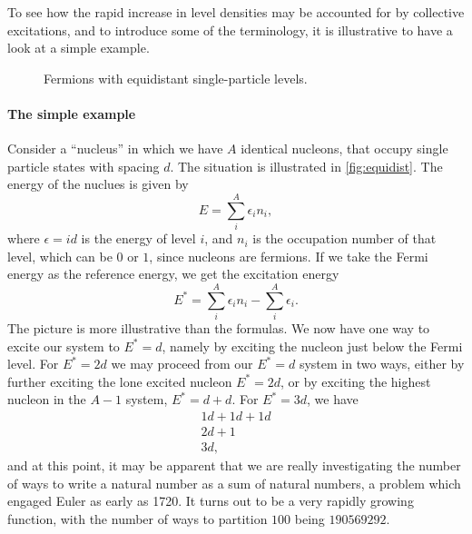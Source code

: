 To see how the rapid increase in level densities may be accounted for by collective excitations, and to introduce some of the terminology, it is illustrative to have a look at a simple example.

\begin{figure}

\caption{\label{fig:equidist} Fermions with equidistant single-particle levels.}
\end{figure}

\paragraph{The simple example}
Consider a ``nucleus'' in which we have $A$ identical nucleons, that occupy single particle states with spacing $d$. The situation is illustrated in \autoref{fig:equidist}. The energy of the nuclues is given by 
\begin{equation}
E=\sum_i^A \epsilon_i n_i,
\end{equation}
where $\epsilon = id$ is the energy of level $i$, and $n_i$ is the occupation number of that level, which can be $0$ or $1$, since nucleons are fermions.
If we take the Fermi energy as the reference energy, we get the excitation energy
\begin{equation}
E^*=\sum_i^A \epsilon_i n_i - \sum_i^A \epsilon_i.
\end{equation}
The picture is more illustrative than the formulas. We now have one way to excite our system to $E^*=d$, namely by exciting the nucleon just below the Fermi level. For $E^*=2d$ we may proceed from our $E^*=d$ system in two ways, either by further exciting the lone excited nucleon $E^* = 2d$, or by exciting the highest nucleon in the $A-1$ system, $E^*=d+d$. For $E^*=3d$, we have
\begin{equation}
\begin{aligned}
1d+1d+1d \\
2d+1 \\
3d,
\end{aligned}
\end{equation}
and at this point, it may be apparent that we are really investigating the number of ways to write a natural number as a sum of natural numbers, a problem which engaged Euler as early as 1720\cite{mathworld}. It turns out to be a very rapidly growing function, with the number of ways to partition $100$ being $190 569 292$\cite{mathworld}.

